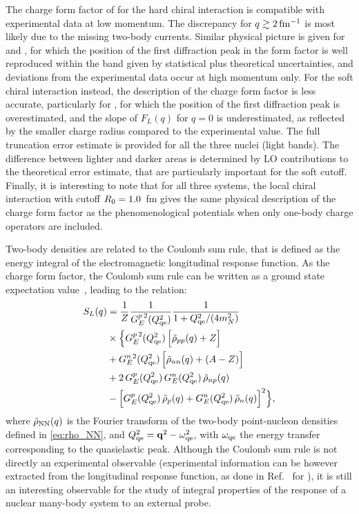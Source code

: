 \documentclass[aps,prc,twocolumn,superscriptaddress,floatfix]{revtex4-1}
\begin{document}
The charge form factor of  for the hard chiral interaction is compatible
with experimental data at low momentum. The discrepancy for $q\gtrsim2\,\rm fm^{-1}$ is most likely
due to the missing two-body currents. Similar physical picture is given for  and
, for which the position of the first diffraction peak in the form factor 
is well reproduced within the band given by statistical plus theoretical uncertainties, 
and deviations from the experimental data occur at high momentum only.
For the soft chiral interaction instead, the description of the charge form factor is less 
accurate, particularly for , for which the position of the first diffraction 
peak is overestimated, and the slope of $F_L(q)$ for $q=0$ is underestimated, 
as reflected by the smaller charge radius compared to the experimental value.
The full truncation error estimate is provided for all the three nuclei (light bands). 
The difference between lighter and darker areas is determined by LO contributions 
to the theoretical error estimate, that are particularly important for the soft cutoff.
Finally, it is interesting to note that for all three systems, the local chiral interaction with 
cutoff $R_0=1.0\,\rm$ fm gives the same physical description of the charge form factor as 
the phenomenological potentials when only one-body charge operators are included.

Two-body densities are related to the Coulomb sum rule, that is defined as the energy integral 
of the electromagnetic longitudinal response function. As the charge form factor, the Coulomb sum rule
can be written as a ground state expectation value~\cite{Mcvoy:1962}, leading to the relation:
\begin{align}
	S_L(q)&=\frac{1}{Z} \frac{1}{G_E^{p\,2}(Q_{\rm qe}^2)}\frac{1}{1+Q_{\rm qe}^2/(4 m_N^2)} \nonumber \\
    & \times\Big\{ G_E^{p\,2}(Q_{\rm qe}^2)\,\Big[\tilde{\rho}_{pp}(q)+Z\Big] \nonumber \\
    &        +G_E^{n\,2}(Q_{\rm qe}^2)\,\Big[\tilde{\rho}_{nn}(q)+(A-Z)\Big] \nonumber \\
    &        +2\,G_E^p(Q_{\rm qe}^2)\,G_E^n(Q_{\rm qe}^2)\,\tilde{\rho}_{np}(q) \nonumber \\ 
    & -\Big[G_E^p(Q_{\rm qe}^2)\,\tilde{\rho}_p(q)+G_E^n(Q_{\rm qe}^2)\,\tilde{\rho}_n(q)\Big]^2 \Big\}, 
	\label{eq:sl}
\end{align}
where $\tilde{\rho}_{\rm{NN}}(q)$ is the Fourier transform of the two-body point-nucleon densities defined in \cref{eq:rho_NN},
and $Q^2_{\rm qe}=\vb{q}^2-\omega^2_{\rm qe}$, with $\omega_{\rm qe}$ the energy transfer 
corresponding to the quasielastic peak.
Although the Coulomb sum rule is not directly an experimental observable (experimental information can be however
extracted from the longitudinal response function, as done in Ref.~\cite{Lovato:2016} for ), it is
still an interesting observable for the study of integral properties of the response of a nuclear many-body system to an
external probe.
\end{document}
